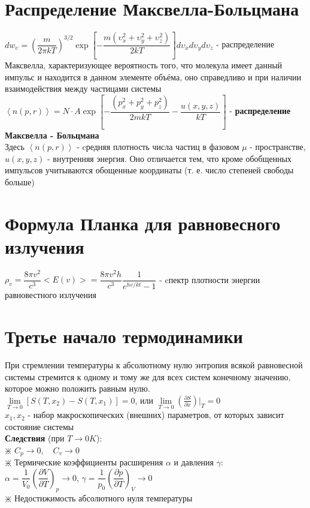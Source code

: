 \begin{multicols*}{2}
		\section{Распределение Максвелла-Больцмана}
		$dw_{\upsilon} =\left(\dfrac{m}{2\pi kT}\right)^{3/2}\exp\left[-\dfrac{m(\upsilon^2_x + \upsilon^2_y +\upsilon^2_z)}{2kT}\right]d\upsilon_x d\upsilon_y d\upsilon_z$ - распределение Максвелла, характеризующее вероятность того, что молекула имеет данный импульс и находится в данном элементе объёма, оно справедливо и при наличии взаимодействия между частицами системы \\
		$\left\langle n(p, r)\right\rangle = N\cdot A\exp \left[-\dfrac{(p^2_x + p^2_y + p^2_z)}{2mkT} - \dfrac{u(x,y,z)}{kT}\right]$ - \textbf{распределение Максвелла - Больцмана}\\
		Здесь $\left\langle n(p, r)\right\rangle$ - cредняя плотность числа частиц в фазовом $\mu$ - пространстве, $u(x,y,z)$ - внутренняя энергия. Оно отличается тем, что кроме обобщенных импульсов учитываются обощенные координаты (т. е. число степеней свободы больше)\\

		\section{Формула Планка для равновесного излучения}
		$\rho_v=\dfrac{8\pi v^2}{c^3}<E(v)>=\dfrac{8\pi v^2 h}{c^3}\dfrac{1}{e^{hv/kt}-1}$ - cпектр плотности энергии равновестного излучения\\

		\section{Третье начало термодинамики}
		При стремлении температуры к абсолютному  нулю энтропия всякой равновесной системы стремится к одному и тому же для всех систем конечному значению, которое можно положить равным нулю.\\
		$\lim\limits_{T\to 0} [S(T, x_2) - S(T, x_1)] =0$, или $\lim\limits_{T\to 0} \left(\frac{\partial S}{\partial x}\right)\vert _T = 0$\\
		$x_1, x_2$ - набор макроскопических (внешних) параметров, от которых зависит состояние системы\\
		\textbf{Следствия} (при $T\rightarrow 0K$):\\
		$\divideontimes$ $C_p \rightarrow 0, \quad C_v \rightarrow 0$\\
		$\divideontimes$ Термические коэффициенты расширения $\alpha$ и давления $\gamma$:\\
		$\alpha = \dfrac{1}{V_0}\left(\dfrac{\partial V}{\partial T}\right)_p \rightarrow 0$, \quad $\gamma = \dfrac{1}{p_0}\left(\dfrac{\partial p}{\partial T}\right)_V \rightarrow 0$\\
		$\divideontimes$ Недостижимость абсолютного нуля температуры\\


\end{multicols*}

